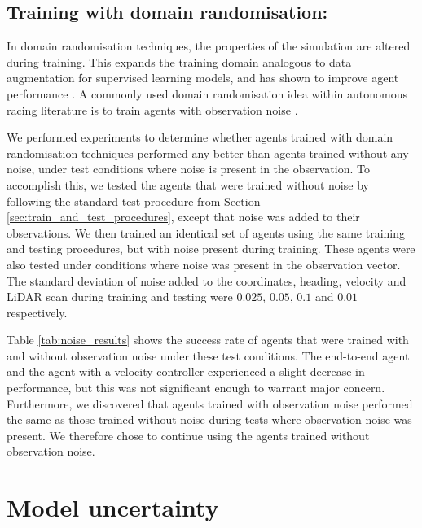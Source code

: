 \subsection{Training with domain randomisation:}
In domain randomisation techniques, the properties of the simulation are altered during training. 
This expands the training domain analogous to data augmentation for supervised learning models, and has shown to improve agent performance \cite{Dai2022}.
A commonly used domain randomisation idea within autonomous racing literature is to train agents with observation noise \cite{Fuchs2021, Ivanov2020, hsu2022, Chisari2021, Evans2021a}.

We performed experiments to determine whether agents trained with domain randomisation techniques performed any better than agents trained without any noise, under test conditions where noise is present in the observation.
To accomplish this, we tested the agents that were trained without noise by following the standard test procedure from Section \ref{sec:train_and_test_procedures}, except that noise was added to their observations.
We then trained an identical set of agents using the same training and testing procedures, but with noise present during training.
These agents were also tested under conditions where noise was present in the observation vector.
The standard deviation of noise added to the coordinates, heading, velocity and LiDAR scan during training and testing were $0.025$, $0.05$, $0.1$ and $0.01$ respectively.

Table \ref{tab:noise_results} shows the success rate of agents that were trained with and without observation noise under these test conditions.
The end-to-end agent and the agent with a velocity controller experienced a slight decrease in performance, but this was not significant enough to warrant major concern.
Furthermore, we discovered that agents trained with observation noise performed the same as those trained without noise during tests where observation noise was present.
We therefore chose to continue using the agents trained without observation noise.




\section{Model uncertainty}


